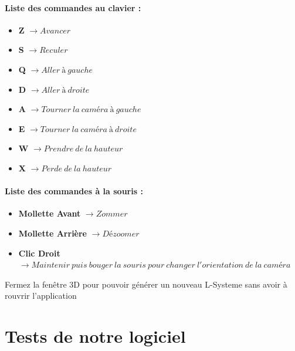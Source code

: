 \paragraph{Liste des commandes au clavier : }
\begin{itemize}
    \item \textbf{Z} $\xrightarrow{} Avancer$
    \item \textbf{S} $\xrightarrow{} Reculer$
    \item \textbf{Q} $\xrightarrow{} Aller \ à \ gauche$
    \item \textbf{D} $\xrightarrow{} Aller \ à \ droite$
    \item \textbf{A} $\xrightarrow{} Tourner \ la \ caméra \ à \ gauche$
    \item \textbf{E} $\xrightarrow{} Tourner \ la \ caméra \ à \ droite$
    \item \textbf{W} $\xrightarrow{} Prendre \ de \ la \ hauteur$
    \item \textbf{X} $\xrightarrow{} Perde \ de \ la \ hauteur$
    \end{itemize}
\paragraph{Liste des commandes à la souris :}
    \begin{itemize}
    \item \textbf{Mollette Avant} $\xrightarrow{} Zommer$
    \item \textbf{Mollette Arrière} $\xrightarrow{} Dézoomer$
    \item \textbf{Clic Droit} $\xrightarrow{} Maintenir \ puis \ bouger \ la \ souris \ pour \ changer \ l'orientation \ de \ la \ caméra$
    
\end{itemize}


Fermez la fenêtre 3D pour pouvoir générer un nouveau L-Systeme sans avoir à rouvrir l'application

\section{Tests de notre logiciel}

